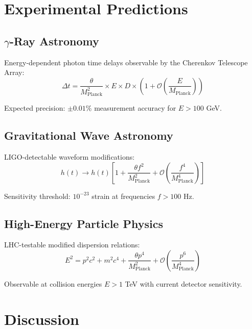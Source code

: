 \documentclass[twocolumn,showpacs,preprintnumbers,amsmath,amssymb,aps,prl]{revtex4-1}
\begin{document}
\section{Experimental Predictions}

\subsection{$\gamma$-Ray Astronomy}

Energy-dependent photon time delays observable by the Cherenkov Telescope Array:
\begin{equation}
\Delta t = \frac{\theta}{M_{\text{Planck}}^2} \times E \times D \times \left(1 + \mathcal{O}\left(\frac{E}{M_{\text{Planck}}}\right)\right)
\label{eq:gamma_delay}
\end{equation}

Expected precision: $\pm 0.01\%$ measurement accuracy for $E > 100$ GeV.

\subsection{Gravitational Wave Astronomy}

LIGO-detectable waveform modifications:
\begin{equation}
h(t) \to h(t)\left[1 + \frac{\theta f^2}{M_{\text{Planck}}^2} + \mathcal{O}\left(\frac{f^4}{M_{\text{Planck}}^4}\right)\right]
\label{eq:gw_modification}
\end{equation}

Sensitivity threshold: $10^{-23}$ strain at frequencies $f > 100$ Hz.

\subsection{High-Energy Particle Physics}

LHC-testable modified dispersion relations:
\begin{equation}
E^2 = p^2c^2 + m^2c^4 + \frac{\theta p^4}{M_{\text{Planck}}^2} + \mathcal{O}\left(\frac{p^6}{M_{\text{Planck}}^4}\right)
\label{eq:modified_dispersion}
\end{equation}

Observable at collision energies $E > 1$ TeV with current detector sensitivity.

\section{Discussion}
\end{document}
